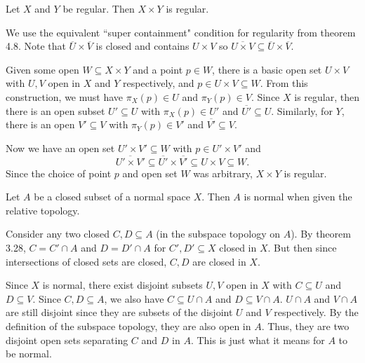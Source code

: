 \documentclass[12 pt, letterpaper]{hmcpset}
\begin{document}
\begin{problem}[4.17]
	Let $X$ and $Y$ be regular. Then $X \times Y$ is regular.
\end{problem}

\begin{solution}
	
We use the equivalent ``super containment" condition for regularity from theorem 4.8. Note that $\overline{U} \times \overline{V}$ is closed and contains $U \times V$ so $\overline{U \times V} \subseteq \overline{U} \times \overline{V}$.

Given some open $W \subseteq X \times Y$ and a point $p \in W$, there is a basic open set $U \times V$ with $U, V$ open in $X$ and $Y$ respectively, and $p \in U \times V \subseteq W$. From this construction, we must have $\pi_{X}(p) \in U$ and $\pi_{Y}(p) \in V$. Since $X$ is regular, then there is an open subset $U' \subseteq U$ with $\pi_{X}(p) \in U'$ and $\overline{U'} \subseteq U$. Similarly, for $Y$, there is an open $V' \subseteq V$ with $\pi_{Y}(p) \in V'$ and $\overline{V'} \subseteq V$. 

Now we have an open set $U' \times V' \subseteq W$ with $p \in U' \times V'$ and
\[
\overline{U' \times V'} \subseteq \overline{U'} \times \overline{V'} \subseteq U \times V \subseteq W.
\]
Since the choice of point $p$ and open set $W$ was arbitrary, $X \times Y$ is regular.
\end{solution}

\pagebreak

\begin{problem}[4.23]
	Let $A$ be a closed subset of a normal space $X$. Then $A$ is normal when given the relative topology.
\end{problem}

\begin{solution}
	Consider any two closed $C, D \subseteq A$ (in the subspace topology on $A$). By theorem 3.28, $C = C' \cap A$ and $D = D' \cap A$ for $C', D' \subseteq X$ closed in $X$. But then since intersections of closed sets are closed, $C, D$ are closed in $X$.

	Since $X$ is normal, there exist disjoint subsets $U, V$ open in $X$ with $C \subseteq U$ and $D \subseteq V$. Since $C, D \subseteq A$, we also have $C \subseteq U \cap A$ and $D \subseteq V \cap A$. $U \cap A$ and $V \cap A$ are still disjoint since they are subsets of the disjoint $U$ and $V$ respectively. By the definition of the subspace topology, they are also open in $A$. Thus, they are two disjoint open sets separating $C$ and $D$ in $A$. This is just what it means for $A$ to be normal.
\end{solution}
\end{document}
